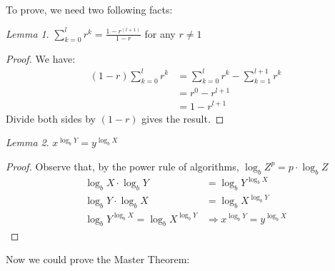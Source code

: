 \documentclass[11pt, a4paper, oneside]{book}
\theoremstyle{theoremdd}
\theoremstyle{remark}
\newtheorem{lemma}{Lemma}[section]
\begin{document}
To prove, we need two following facts: 
\begin{lemma}
$\sum_{k=0}^{l}r^k = \frac{1-r^(l+1)}{1-r}$ for any $r \neq 1$
\end{lemma}

\begin{proof}
We have: 
\begin{align*}
(1-r)\sum_{k=0}^{l}r^k & = \sum_{k=0}^{l}r^k - \sum_{k=1}^{l+1}r^k \\&
						 = r^{0} - r^{l+1} \\&
						 = 1 - r^{l+1}
\end{align*}
Divide both sides by $(1-r)$ gives the result.
\end{proof}

\begin{lemma}
$x^{\log_{b} Y} = y^{\log_{b} X}$
\end{lemma}
\begin{proof}
Observe that, by the power rule of algorithms, $\log_{b} Z^{p} = p\cdot \log_{b}{Z}$
\begin{align*}
\log_{b} X \cdot \log_{b} Y & = \log_{b} Y^{\log_{b} X} \\ 
\log_{b} Y \cdot \log_{b} X & = \log_{b} X^{\log_{b} Y} \\
\log_{b} Y^{\log_{b} X} = \log_{b} X^{\log_{b} Y} & \Rightarrow x^{\log_{b} Y} = y^{\log_{b} X}
\end{align*}

\end{proof}
Now we could prove the Master Theorem: 
\end{document}
